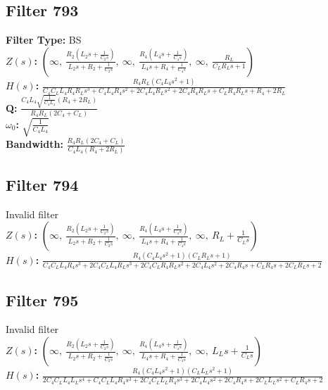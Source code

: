 \documentclass{article}
\begin{document}
\subsection*{Filter 793}
\textbf{Filter Type:} BS \\ 
\textbf{$Z(s)$:} $\left( \infty, \  \frac{R_{2} \left(L_{2} s + \frac{1}{C_{2} s}\right)}{L_{2} s + R_{2} + \frac{1}{C_{2} s}}, \  \infty, \  \frac{R_{4} \left(L_{4} s + \frac{1}{C_{4} s}\right)}{L_{4} s + R_{4} + \frac{1}{C_{4} s}}, \  \infty, \  \frac{R_{L}}{C_{L} R_{L} s + 1}\right)$ \\ 
\textbf{$H(s)$:} $\frac{R_{4} R_{L} \left(C_{4} L_{4} s^{2} + 1\right)}{C_{4} C_{L} L_{4} R_{4} R_{L} s^{3} + C_{4} L_{4} R_{4} s^{2} + 2 C_{4} L_{4} R_{L} s^{2} + 2 C_{4} R_{4} R_{L} s + C_{L} R_{4} R_{L} s + R_{4} + 2 R_{L}}$ \\ 
\textbf{Q:} $\frac{C_{4} L_{4} \sqrt{\frac{1}{C_{4} L_{4}}} \left(R_{4} + 2 R_{L}\right)}{R_{4} R_{L} \left(2 C_{4} + C_{L}\right)}$ \\ 
\textbf{$\omega_0$:} $\sqrt{\frac{1}{C_{4} L_{4}}}$ \\ 
\textbf{Bandwidth:} $\frac{R_{4} R_{L} \left(2 C_{4} + C_{L}\right)}{C_{4} L_{4} \left(R_{4} + 2 R_{L}\right)}$ \\ 
\subsection*{Filter 794}
Invalid filter \\ 
\textbf{$Z(s)$:} $\left( \infty, \  \frac{R_{2} \left(L_{2} s + \frac{1}{C_{2} s}\right)}{L_{2} s + R_{2} + \frac{1}{C_{2} s}}, \  \infty, \  \frac{R_{4} \left(L_{4} s + \frac{1}{C_{4} s}\right)}{L_{4} s + R_{4} + \frac{1}{C_{4} s}}, \  \infty, \  R_{L} + \frac{1}{C_{L} s}\right)$ \\ 
\textbf{$H(s)$:} $\frac{R_{4} \left(C_{4} L_{4} s^{2} + 1\right) \left(C_{L} R_{L} s + 1\right)}{C_{4} C_{L} L_{4} R_{4} s^{3} + 2 C_{4} C_{L} L_{4} R_{L} s^{3} + 2 C_{4} C_{L} R_{4} R_{L} s^{2} + 2 C_{4} L_{4} s^{2} + 2 C_{4} R_{4} s + C_{L} R_{4} s + 2 C_{L} R_{L} s + 2}$ \\ 
\subsection*{Filter 795}
Invalid filter \\ 
\textbf{$Z(s)$:} $\left( \infty, \  \frac{R_{2} \left(L_{2} s + \frac{1}{C_{2} s}\right)}{L_{2} s + R_{2} + \frac{1}{C_{2} s}}, \  \infty, \  \frac{R_{4} \left(L_{4} s + \frac{1}{C_{4} s}\right)}{L_{4} s + R_{4} + \frac{1}{C_{4} s}}, \  \infty, \  L_{L} s + \frac{1}{C_{L} s}\right)$ \\ 
\textbf{$H(s)$:} $\frac{R_{4} \left(C_{4} L_{4} s^{2} + 1\right) \left(C_{L} L_{L} s^{2} + 1\right)}{2 C_{4} C_{L} L_{4} L_{L} s^{4} + C_{4} C_{L} L_{4} R_{4} s^{3} + 2 C_{4} C_{L} L_{L} R_{4} s^{3} + 2 C_{4} L_{4} s^{2} + 2 C_{4} R_{4} s + 2 C_{L} L_{L} s^{2} + C_{L} R_{4} s + 2}$ \\ 
\end{document}
